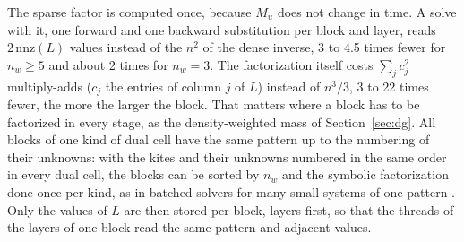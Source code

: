 \documentclass[preprint,12pt]{elsarticle}
\theoremstyle{definition}
\begin{document}
The sparse factor is computed once, because $M_u$ does not change in time. A solve with it, one forward and
one backward substitution per block and layer, reads $2\,\mathrm{nnz}(L)$ values instead of the $n^2$ of the
dense inverse, 3 to 4.5 times fewer for $n_w \ge 5$ and about 2 times for $n_w = 3$. The factorization
itself costs $\sum_j c_j^2$ multiply-adds ($c_j$ the entries of column $j$ of $L$) instead of $n^3/3$, 3 to 22
times fewer, the more the larger the block.
That matters where a block has to be factorized in every stage, as the density-weighted mass of
Section~\ref{sec:dg}. All blocks of one kind of dual cell have the same pattern up to the numbering of
their unknowns: with the kites and their unknowns numbered in the same order in every dual cell, the blocks
can be sorted by $n_w$ and the symbolic factorization done once per kind, as in batched solvers for many
small systems of one pattern \cite{Abdelfattah2017}. Only the values of $L$ are then stored per block, layers
first, so that the threads of the layers of one block read the same pattern and adjacent values.
\end{document}

